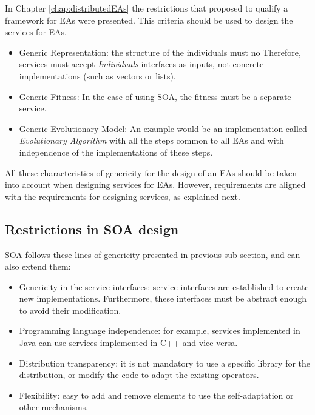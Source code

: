 
In Chapter \ref{chap:distributedEAs} the restrictions that  proposed to qualify a framework for EAs were presented. This criteria should be used to design the services for EAs.

\begin{itemize}
\item Generic Representation: the structure of the individuals must no
  Therefore, services must accept {\em Individuals} interfaces as
  inputs, not concrete implementations (such as vectors or lists). %
\item Generic Fitness: In the case of using SOA, the fitness must be a separate service.
\item Generic Evolutionary Model: An example would be an implementation called {\em Evolutionary Algorithm} with all the steps common to all EAs and with independence of the implementations of these steps.
\end{itemize}
All these characteristics of genericity for the design of an EAs should be taken into account when designing services for EAs. However, requirements are aligned with the requirements for designing services, as explained next.

\subsection{Restrictions in SOA design}

SOA follows these lines of genericity presented in previous sub-section, and can also extend them:
\begin{itemize}
\item Genericity in the service interfaces: service interfaces are established to create new implementations. Furthermore, these interfaces must be abstract enough to avoid their modification.
\item Programming language independence: for example, services implemented in Java can use services implemented in C++ and vice-versa.
\item Distribution transparency: it is not mandatory to use a specific library for the distribution, or modify the code to adapt the existing operators.
\item Flexibility: easy to add and remove elements to use the self-adaptation or other mechanisms.
\end{itemize}

